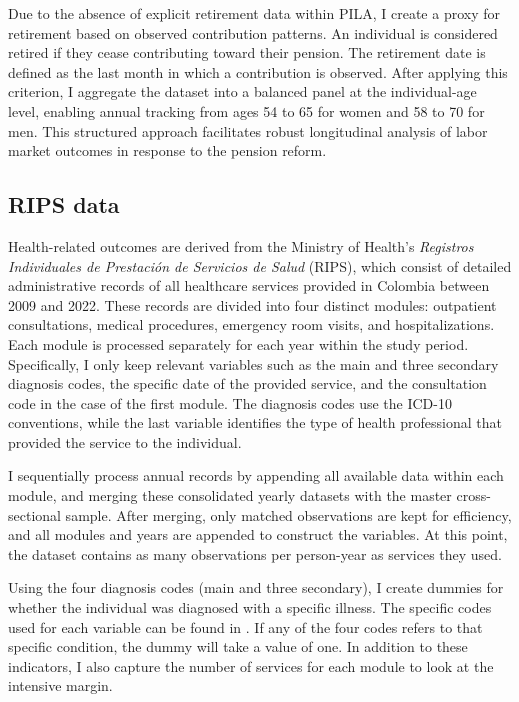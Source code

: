 \documentclass[12pt, a4paper]{article}
\begin{document}
Due to the absence of explicit retirement data within PILA, I create a proxy for retirement based on observed contribution patterns. An individual is considered retired if they cease contributing toward their pension. The retirement date is defined as the last month in which a contribution is observed. After applying this criterion, I aggregate the dataset into a balanced panel at the individual-age level, enabling annual tracking from ages 54 to 65 for women and 58 to 70 for men. This structured approach facilitates robust longitudinal analysis of labor market outcomes in response to the pension reform.

\subsection{RIPS data}

Health-related outcomes are derived from the Ministry of Health’s \textit{Registros Individuales de Prestación de Servicios de Salud} (RIPS), which consist of detailed administrative records of all healthcare services provided in Colombia between 2009 and 2022. These records are divided into four distinct modules: outpatient consultations, medical procedures, emergency room visits, and hospitalizations. Each module is processed separately for each year within the study period. Specifically, I only keep relevant variables such as the main and three secondary diagnosis codes, the specific date of the provided service, and the consultation code in the case of the first module. The diagnosis codes use the ICD-10 conventions, while the last variable identifies the type of health professional that provided the service to the individual. 

I sequentially process annual records by appending all available data within each module, and merging these consolidated yearly datasets with the master cross-sectional sample. After merging, only matched  observations are kept for efficiency, and all modules and years are appended to construct the variables. At this point, the dataset contains as many observations per person-year as services they used.

Using the four diagnosis codes (main and three secondary), I create dummies for whether the individual was diagnosed with a specific illness.  The specific codes used for each variable can be found in . If any of the four codes refers to that specific condition, the dummy will take a value of one. In addition to these indicators, I also capture the number of services for each module to look at the intensive margin.
\end{document}

